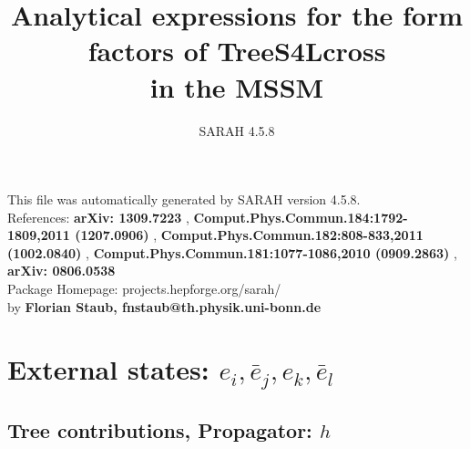 \documentclass[A4,landscape]{article}
\begin{document}
\title{Analytical expressions for the form factors of TreeS4Lcross\\ in the MSSM } 
 \author{SARAH 4.5.8} 
 \maketitle 
 \vspace{10cm} 
This file was automatically generated by SARAH version 4.5.8.  \\ 
References: {\bf arXiv: 1309.7223 }, {\bf Comput.Phys.Commun.184:1792-1809,2011 (1207.0906) }, {\bf Comput.Phys.Commun.182:808-833,2011 (1002.0840) }, {\bf Comput.Phys.Commun.181:1077-1086,2010 (0909.2863) }, {\bf arXiv: 0806.0538 } \\ 
Package Homepage: projects.hepforge.org/sarah/ \\ 
by {\bf Florian Staub, fnstaub@th.physik.uni-bonn.de} 
 \pagebreak 
 \tableofcontents 
 \pagebreak 
\section{External states: ${e_{{i}}, \bar{e}_{{j}}, e_{{k}}, \bar{e}_{{l}}}$} 
\subsection{Tree contributions, Propagator: $h$} 
\end{document}
